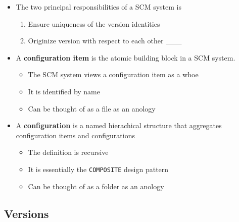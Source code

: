 \documentclass[11pt]{article}
\providecommand{\tightlist}{%
      \setlength{\itemsep}{0pt}\setlength{\parskip}{0pt}}
\begin{document}
\begin{itemize}
\tightlist
\item
  The two principal responsibilities of a SCM system is

  \begin{enumerate}
  \def\labelenumi{\arabic{enumi}.}
  \tightlist
  \item
    Ensure uniqueness of the version identities
  \item
    Originize version with respect to each other \_\_\_
  \end{enumerate}
\item
  A \textbf{configuration item} is the atomic building block in a SCM
  system.

  \begin{itemize}
  \tightlist
  \item
    The SCM system views a configuration item as a whoe
  \item
    It is identified by name
  \item
    Can be thought of as a file as an anology
  \end{itemize}
\item
  A \textbf{configuration} is a named hierachical structure that
  aggregates configuration items and configurations

  \begin{itemize}
  \tightlist
  \item
    The definition is recursive
  \item
    It is essentially the \texttt{COMPOSITE} design pattern
  \item
    Can be thought of as a folder as an anology
  \end{itemize}
\end{itemize}

\hypertarget{versions}{%
\subsection{Versions}\label{versions}}
\end{document}
